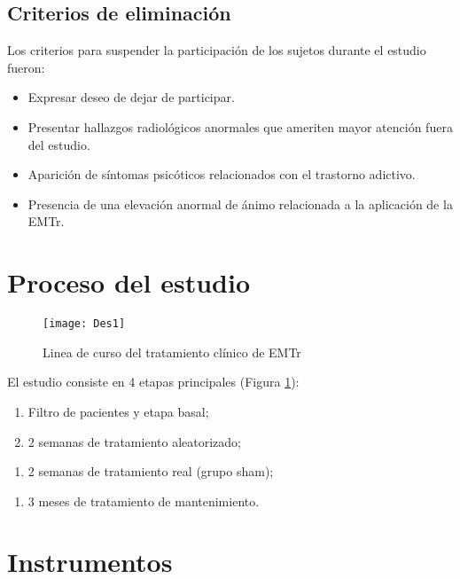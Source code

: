 \subsection{Criterios de eliminación}
Los criterios para suspender la participación de los sujetos durante el estudio fueron:
\begin{itemize}
    \item Expresar deseo de dejar de participar.
    \item Presentar hallazgos radiológicos anormales que ameriten mayor atención fuera del estudio.
    \item Aparición de síntomas psicóticos relacionados con el trastorno adictivo.
    \item Presencia de una elevación anormal de ánimo relacionada a la aplicación de la EMTr.
\end{itemize}

\section{Proceso del estudio}
\begin{figure}[ht]
    \centering
    \texttt{[image: Des1]}
    \caption{Linea de curso del tratamiento clínico de EMTr}
    \label{fig:txTMS}
\end{figure}

El estudio consiste en 4 etapas principales (Figura \ref{fig:txTMS}):
\begin{enumerate}[start=0,left=\parindent,label=T\arabic*:]
    \item Filtro de pacientes y etapa basal;
    \item 2 semanas de tratamiento aleatorizado;
\end{enumerate}
\begin{enumerate}[left=\parindent,label=T-4:]
    \item 2 semanas de tratamiento real (grupo sham);
\end{enumerate}
\begin{enumerate}[start=2,left=\parindent,label=T\arabic*:]
    \item 3 meses de tratamiento de mantenimiento.
\end{enumerate}

\section{Instrumentos}
